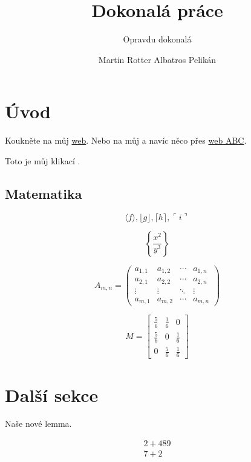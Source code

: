 \documentclass[
	iwona=true,									%
	printversion=false,					%
	joinlists=true,							%
	glossaries=true,						%
	figures=true,								%
	tables=true,								%
	sourcecodes=true,						%
	theorems=true,							%
	bibencoding=utf8,						%
	language=czech,							%
	encoding=utf8,							%
	master=true,								%
  index=true									%
]{updiplom}
\title{Dokonalá práce}				%
\subtitle{Opravdu dokonalá}		%
\author{Martin Rotter Albatros Pelikán}
\begin{document}
\maketitle

\section{Úvod}
Koukněte na můj \href{http://www.seznam.cz}{web}. Nebo na můj  a navíc něco přes \hyperlink{http://www.abc.cz}{web ABC}.

Toto je můj klikací .

\subsection{Matematika}
$$\langle f \rangle, \lfloor g \rfloor,
\lceil h \rceil, \ulcorner i \urcorner$$

$$\left\{\frac{x^2}{y^3}\right\}$$

$$
A_{m,n} =
 \begin{pmatrix}
  a_{1,1} & a_{1,2} & \cdots & a_{1,n} \\
  a_{2,1} & a_{2,2} & \cdots & a_{2,n} \\
  \vdots  & \vdots  & \ddots & \vdots  \\
  a_{m,1} & a_{m,2} & \cdots & a_{m,n}
 \end{pmatrix}
$$

$$
M = \begin{bmatrix}
       \frac{5}{6} & \frac{1}{6} & 0           \\[0.3em]
       \frac{5}{6} & 0           & \frac{1}{6} \\[0.3em]
       0           & \frac{5}{6} & \frac{1}{6}
     \end{bmatrix}
$$

\section{Další sekce}

\begin{lemma}
Naše nové lemma.
\end{lemma}

\begin{align}
2+489 \\
7+2
\end{align}
\end{document}
